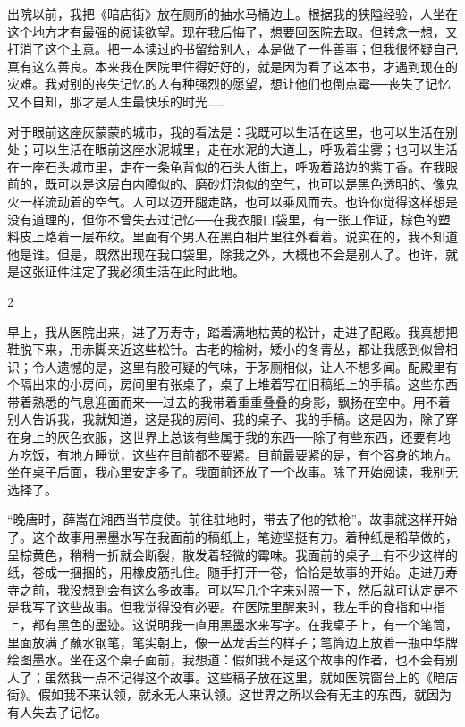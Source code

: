 出院以前，我把《暗店街》放在厕所的抽水马桶边上。根据我的狭隘经验，人坐在这个地方才有最强的阅读欲望。现在我后悔了，想要回医院去取。但转念一想，又打消了这个主意。把一本读过的书留给别人，本是做了一件善事；但我很怀疑自己真有这么善良。本来我在医院里住得好好的，就是因为看了这本书，才遇到现在的灾难。我对别的丧失记忆的人有种强烈的愿望，想让他们也倒点霉──丧失了记忆又不自知，那才是人生最快乐的时光…… 

对于眼前这座灰蒙蒙的城市，我的看法是：我既可以生活在这里，也可以生活在别处；可以生活在眼前这座水泥城里，走在水泥的大道上，呼吸着尘雾；也可以生活在一座石头城市里，走在一条龟背似的石头大街上，呼吸着路边的紫丁香。在我眼前的，既可以是这层白内障似的、磨砂灯泡似的空气，也可以是黑色透明的、像鬼火一样流动着的空气。人可以迈开腿走路，也可以乘风而去。也许你觉得这样想是没有道理的，但你不曾失去过记忆──在我衣服口袋里，有一张工作证，棕色的塑料皮上烙着一层布纹。里面有个男人在黑白相片里往外看着。说实在的，我不知道他是谁。但是，既然出现在我口袋里，除我之外，大概也不会是别人了。也许，就是这张证件注定了我必须生活在此时此地。 

2 

早上，我从医院出来，进了万寿寺，踏着满地枯黄的松针，走进了配殿。我真想把鞋脱下来，用赤脚亲近这些松针。古老的榆树，矮小的冬青丛，都让我感到似曾相识；令人遗憾的是，这里有股可疑的气味，于茅厕相似，让人不想多闻。配殿里有个隔出来的小房间，房间里有张桌子，桌子上堆着写在旧稿纸上的手稿。这些东西带着熟悉的气息迎面而来──过去的我带着重重叠叠的身影，飘扬在空中。用不着别人告诉我，我就知道，这是我的房间、我的桌子、我的手稿。这是因为，除了穿在身上的灰色衣服，这世界上总该有些属于我的东西──除了有些东西，还要有地方吃饭，有地方睡觉，这些在目前都不要紧。目前最要紧的是，有个容身的地方。坐在桌子后面，我心里安定多了。我面前还放了一个故事。除了开始阅读，我别无选择了。 

“晚唐时，薛嵩在湘西当节度使。前往驻地时，带去了他的铁枪”。故事就这样开始了。这个故事用黑墨水写在我面前的稿纸上，笔迹坚挺有力。着种纸是稻草做的，呈棕黄色，稍稍一折就会断裂，散发着轻微的霉味。我面前的桌子上有不少这样的纸，卷成一捆捆的，用橡皮筋扎住。随手打开一卷，恰恰是故事的开始。走进万寿寺之前，我没想到会有这么多故事。可以写几个字来对照一下，然后就可认定是不是我写了这些故事。但我觉得没有必要。在医院里醒来时，我左手的食指和中指上，都有黑色的墨迹。这说明我一直用黑墨水来写字。在我桌子上，有一个笔筒，里面放满了蘸水钢笔，笔尖朝上，像一丛龙舌兰的样子；笔筒边上放着一瓶中华牌绘图墨水。坐在这个桌子面前，我想道：假如我不是这个故事的作者，也不会有别人了；虽然我一点不记得这个故事。这些稿子放在这里，就如医院窗台上的《暗店街》。假如我不来认领，就永无人来认领。这世界之所以会有无主的东西，就因为有人失去了记忆。 

